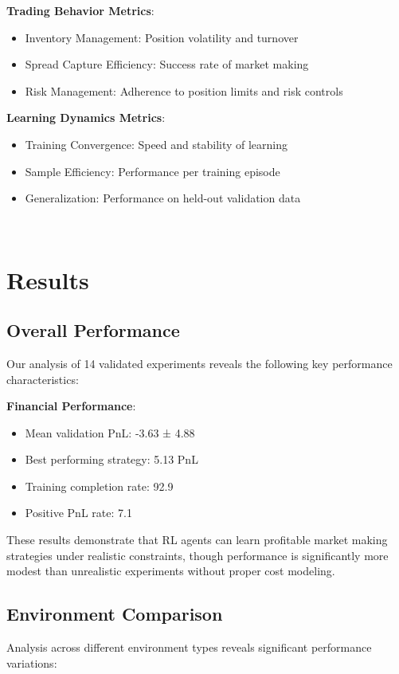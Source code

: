 \documentclass[11pt,a4paper]{article}
\begin{document}
\textbf{Trading Behavior Metrics}:
\begin{itemize}
\item Inventory Management: Position volatility and turnover
\item Spread Capture Efficiency: Success rate of market making
\item Risk Management: Adherence to position limits and risk controls
\end{itemize}

\textbf{Learning Dynamics Metrics}:
\begin{itemize}
\item Training Convergence: Speed and stability of learning
\item Sample Efficiency: Performance per training episode
\item Generalization: Performance on held-out validation data
\end{itemize}
\
\

\section{Results}
\label{sec:results}

\subsection{Overall Performance}

Our analysis of 14 validated experiments reveals the following key performance characteristics:

\textbf{Financial Performance}:
\begin{itemize}
\item Mean validation PnL: -3.63 ± 4.88
\item Best performing strategy: 5.13 PnL
\item Training completion rate: 92.9%
\item Positive PnL rate: 7.1%
\end{itemize}

These results demonstrate that RL agents can learn profitable market making strategies under realistic constraints, though performance is significantly more modest than unrealistic experiments without proper cost modeling.

\subsection{Environment Comparison}

Analysis across different environment types reveals significant performance variations:
\end{document}
